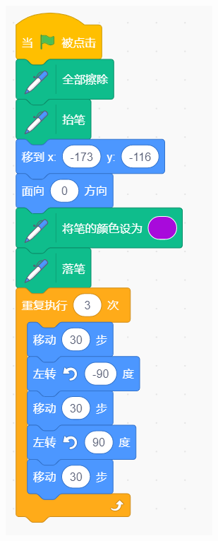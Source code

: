 \documentclass[10pt, a4paper]{article}
\begin{document}
\begin{enumerate}
\begin{figure}[htbp]
\begin{minipage}[t]{.2\textwidth}
\begin{minipage}[t]{.56\textwidth}
                    \centering
                    \includegraphics[width=\textwidth]{31-1.png}

\end{minipage}
\end{minipage}
\end{figure}
\end{enumerate}
\end{document}
